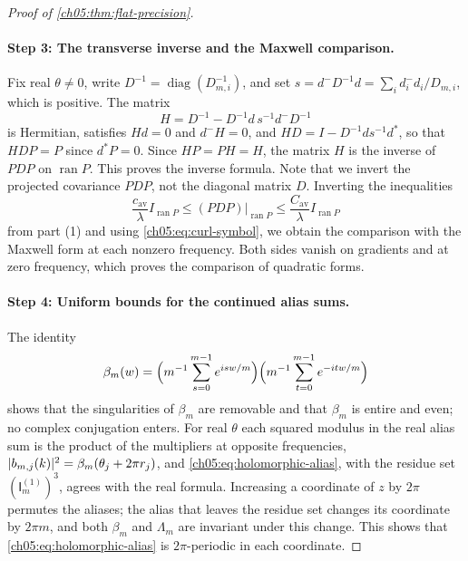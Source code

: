 \begin{proof}[Proof of \cref{ch05:thm:flat-precision}]
\paragraph{Step 3: The transverse inverse and the Maxwell comparison.}
Fix real $\theta\ne0$, write $D^{-1}=\operatorname{diag}(D_{m,i}^{-1})$, and set $s=d^-D^{-1}d=\sum_id_i^-d_i/D_{m,i}$, which is positive. The matrix
\[
 H=D^{-1}-D^{-1}d\,s^{-1}d^-D^{-1}
\]
is Hermitian, satisfies $Hd=0$ and $d^-H=0$, and $HD=I-D^{-1}ds^{-1}d^*$, so that $HDP=P$ since $d^*P=0$. Since $HP=PH=H$, the matrix $H$ is the inverse of $PDP$ on $\operatorname{ran}P$. This proves the inverse formula. Note that we invert the projected covariance $PDP$, not the diagonal matrix $D$. Inverting the inequalities
\[
 \frac{c_{\mathrm{av}}}{\lambda}I_{\operatorname{ran}P}\le(PDP)|_{\operatorname{ran}P}\le\frac{C_{\mathrm{av}}}{\lambda}I_{\operatorname{ran}P}
\]
from part (1) and using \eqref{ch05:eq:curl-symbol}, we obtain the comparison with the Maxwell form at each nonzero frequency. Both sides vanish on gradients and at zero frequency, which proves the comparison of quadratic forms.

\paragraph{Step 4: Uniform bounds for the continued alias sums.}
The identity
\[
 \beta_m(w)=\Bigl(m^{-1}\sum_{s=0}^{m-1}e^{isw/m}\Bigr)\Bigl(m^{-1}\sum_{t=0}^{m-1}e^{-itw/m}\Bigr)
\]
shows that the singularities of $\beta_m$ are removable and that $\beta_m$ is entire and even; no complex conjugation enters. For real $\theta$ each squared modulus in the real alias sum is the product of the multipliers at opposite frequencies, $\lvert b_{m,j}(k)\rvert^2=\beta_m(\theta_j+2\pi r_j)$, and \eqref{ch05:eq:holomorphic-alias}, with the residue set $(\mathsf I_m^{(1)})^3$, agrees with the real formula. Increasing a coordinate of $z$ by $2\pi$ permutes the aliases; the alias that leaves the residue set changes its coordinate by $2\pi m$, and both $\beta_m$ and $\Lambda_m$ are invariant under this change. This shows that \eqref{ch05:eq:holomorphic-alias} is $2\pi$-periodic in each coordinate.


\end{proof}
